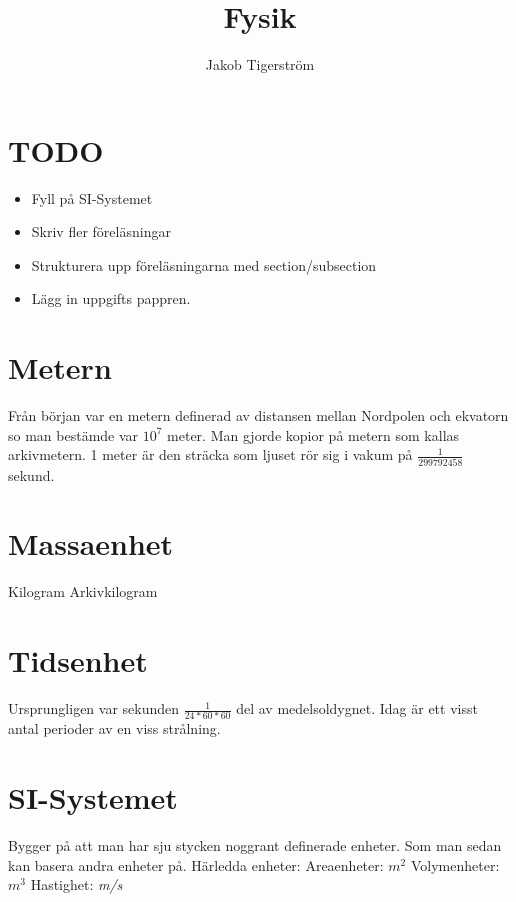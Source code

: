 \documentclass[a4paper,11pt]{article}
\title{Fysik}
\author{Jakob Tigerström}
\begin{document}
\tableofcontents
\newpage
\begin{flushleft}
\section{TODO}
\begin{itemize}
  \item Fyll på SI-Systemet
  \item Skriv fler föreläsningar
  \item Strukturera upp föreläsningarna med section/subsection
  \item Lägg in uppgifts pappren.
\end{itemize}
\section{Metern}
Från början var en metern definerad av distansen mellan Nordpolen och ekvatorn so man bestämde var $ 10^7 $ meter.
Man gjorde kopior på metern som kallas arkivmetern.
1 meter är den sträcka som ljuset rör sig i vakum på $ \frac{1}{299792458} $ sekund.
\newline
\newline
\section{Massaenhet}
Kilogram
\newline
Arkivkilogram
\newline
\newline
\section{Tidsenhet}
Ursprungligen var sekunden $ \frac{1}{24*60*60} $ del av medelsoldygnet.
\newline
Idag är ett visst antal perioder av en viss strålning.
\newline
\newline
\section{SI-Systemet}
Bygger på att man har sju stycken noggrant definerade enheter. Som man sedan kan basera andra enheter på.
\newline
Härledda enheter:\newline
Areaenheter: $ m^2 $\newline
Volymenheter: $ m^3 $\newline
Hastighet:  \textit{m/s}\newline


\end{flushleft}
\end{document}
